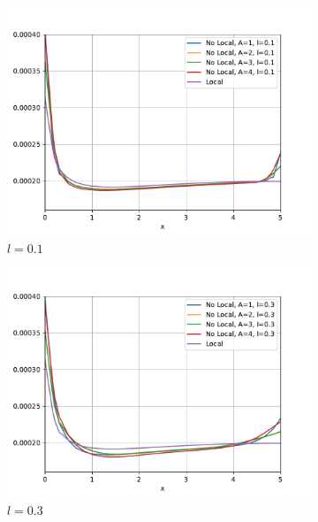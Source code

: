 		\begin{figure}
		    \centering
		    \sffamily
		    \begin{subfigure}{0.48\textwidth}
		    \centering
		        \includegraphics[width=\textwidth]{figuras/Placa/Perfiles/Y/Y0.1_0.019.pdf}
		        \caption{$l=0.1$}
		        \label{fig:perfilesY0019.01}
		    \end{subfigure}
		    \begin{subfigure}{0.48\textwidth}
		    \centering
		        \includegraphics[width=\textwidth]{figuras/Placa/Perfiles/Y/Y0.3_0.019.pdf}
		        \caption{$l=0.3$}
		        \label{fig:perfilesY0019.03}
		    \end{subfigure}
		    \quad
		    \begin{subfigure}{0.48\textwidth}

\end{subfigure}
\end{figure}
